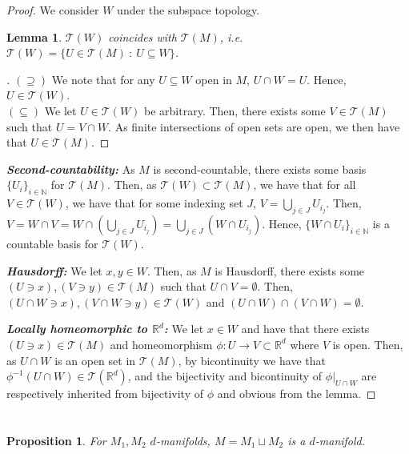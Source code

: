 \documentclass[english]{article}
\newcommand{\evat}[3]{\left. #1\right|_{#2}^{#3}}
\newcommand{\RR}{\mathbb{R}}
\newcommand{\NN}{\mathbb{N}}
\newenvironment{subproof}[1][\proofname]{%
	\renewcommand{\qedsymbol}{$\blacksquare$}%
	\begin{proof}[#1]%
	}{%
	\end{proof}%
}
\newcommand{\prob}[1]{\setcounter{section}{#1-1}\section{}}
\newtheorem*{lemma*}{Lemma}
\newtheorem*{proposition*}{Proposition}
\theoremstyle{remark}
\theoremstyle{definition}
\newcommand{\Tt}{\mathcal{T}}
\newcommand{\setc}[2]{\{ #1\::\:#2 \}}
\begin{document}
\begin{proof}
	We consider $W$ under the subspace topology.
	\begin{lemma*}
		$\Tt(W)$ coincides with $\Tt(M)$, i.e. $\Tt(W)=\setc{U\in\Tt(M)}{U\subseteq W}$.
	\end{lemma*}
\begin{subproof}
	$(\supseteq)$ We note that for any $U\subseteq W$ open in $M$, $U\cap W=U$. Hence, $U\in \Tt(W)$.\\
	$(\subseteq)$ We let $U\in \Tt(W)$ be arbitrary. Then, there exists some $V\in \Tt(M)$ such that $U=V\cap W$. As finite intersections of open sets are open, we then have that $U\in \Tt(M)$. 
\end{subproof}
\textbf{\emph{Second-countability:}} As $M$ is second-countable, there exists some basis $\{U_i\}_{i\in \NN}$ for $\Tt(M)$. Then, as $\Tt(W)\subset \Tt(M)$, we have that for all $V\in \Tt(W)$, we have that for some indexing set $J$, $V=\bigcup_{j\in J}U_{i_j}$. Then, $V=W\cap V=W\cap \left(\bigcup_{j\in J}U_{i_j}\right)=\bigcup_{j\in J}(W\cap U_{i_j})$. Hence, $\{W\cap U_i\}_{i\in \NN}$ is a countable basis for $\Tt(W)$.

\textbf{\emph{Hausdorff:}} We let $x,y\in W$. Then, as $M$ is Hausdorff, there exists some $(U\ni x),(V\ni y)\in \Tt(M)$ such that  $U\cap V=\emptyset$. Then, $(U\cap W\ni x),(V\cap W\ni y)\in \Tt(W)$ and $(U\cap W)\cap (V\cap W)=\emptyset$.

\textbf{\emph{Locally homeomorphic to $\RR^d$:}} We let $x\in W$ and have that there exists $(U\ni x)\in \Tt(M)$ and homeomorphism $\phi:U\to V\subset \RR^d$ where $V$ is open. Then, as $U\cap W$ is an open set in $\Tt(M)$, by bicontinuity we have that $\phi^{-1}(U\cap W)\in \Tt(\RR^d)$, and the bijectivity and bicontinuity of $\evat{\phi}{U\cap W}{}$ are respectively inherited from bijectivity of $\phi$ and obvious from the lemma.
\end{proof}
\prob{3}
\begin{proposition*}
	For $M_1,M_2$ $d$-manifolds, $M=M_1\sqcup M_2$ is a $d$-manifold.
\end{proposition*}
\end{document}
